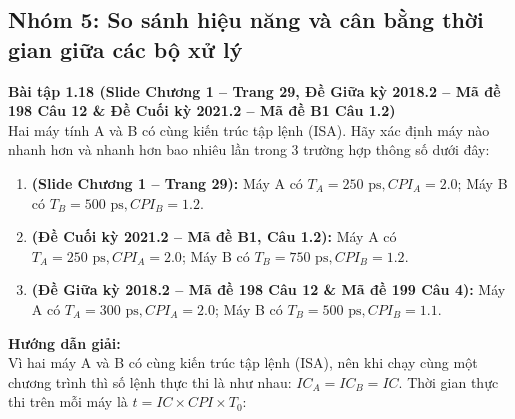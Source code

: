 \subsection{Nhóm 5: So sánh hiệu năng và cân bằng thời gian giữa các bộ xử lý}

\textbf{Bài tập 1.18 (Slide Chương 1 -- Trang 29, Đề Giữa kỳ 2018.2 -- Mã đề 198 Câu 12 \& Đề Cuối kỳ 2021.2 -- Mã đề B1 Câu 1.2)}\\
Hai máy tính A và B có cùng kiến trúc tập lệnh (ISA). Hãy xác định máy nào nhanh hơn và nhanh hơn bao nhiêu lần trong 3 trường hợp thông số dưới đây:
\begin{enumerate}[label=\alph*)]
    \item \textbf{(Slide Chương 1 -- Trang 29):} Máy A có $T_A = 250\text{ ps}, CPI_A = 2.0$; Máy B có $T_B = 500\text{ ps}, CPI_B = 1.2$.
    \item \textbf{(Đề Cuối kỳ 2021.2 -- Mã đề B1, Câu 1.2):} Máy A có $T_A = 250\text{ ps}, CPI_A = 2.0$; Máy B có $T_B = 750\text{ ps}, CPI_B = 1.2$.
    \item \textbf{(Đề Giữa kỳ 2018.2 -- Mã đề 198 Câu 12 \& Mã đề 199 Câu 4):} Máy A có $T_A = 300\text{ ps}, CPI_A = 2.0$; Máy B có $T_B = 500\text{ ps}, CPI_B = 1.1$.
\end{enumerate}
\textbf{Hướng dẫn giải:}\\
Vì hai máy A và B có cùng kiến trúc tập lệnh (ISA), nên khi chạy cùng một chương trình thì số lệnh thực thi là như nhau: $IC_A = IC_B = IC$. Thời gian thực thi trên mỗi máy là $t = IC \times CPI \times T_0$:
